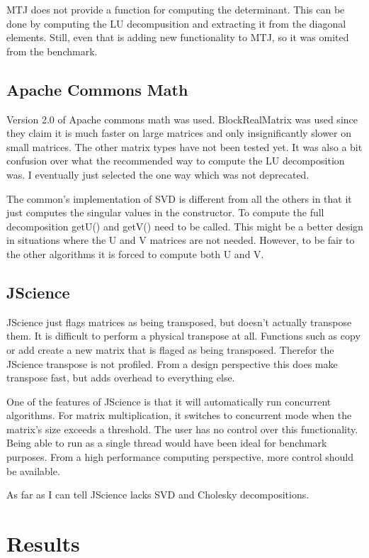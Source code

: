 \documentclass[12pt]{article}%
\begin{document}
MTJ does not provide a function for computing the determinant.  This can be done by computing the LU decompusition and extracting it from the diagonal elements.  Still, even that is adding new functionality to MTJ, so it was omited from the benchmark.

\subsection{Apache Commons Math}

Version 2.0 of Apache commons math was used.  BlockRealMatrix was used since they claim it is much faster on large matrices and only insignificantly slower on small matrices.  The other matrix types have not been tested yet.  It was also a bit confusion over what the recommended way to compute the LU decomposition was.  I eventually just selected the one way which was not deprecated.

The common's implementation of SVD is different from all the others in that it just computes the singular values in the constructor.  To compute the full decomposition getU() and getV() need to be called.  This might be a better design in situations where the U and V matrices are not needed.  However, to be fair to the other algorithms it is forced to compute both U and V.

\subsection{JScience}

JScience just flags matrices as being transposed, but doesn't actually transpose them.  It is difficult to perform a physical transpose at all.  Functions such as copy or add create a new matrix that is flaged as being transposed.  Therefor the JScience transpose is not profiled.  From a design perspective this does make transpose fast, but adds overhead to everything else.

One of the features of JScience is that it will automatically run concurrent algorithms.  For matrix multiplication, it switches to concurrent mode when the matrix's size exceeds a threshold.   The user has no control over this functionality.  Being able to run as a single thread would have been ideal for benchmark purposes.  From a high performance computing perspective, more control should be available.

As far as I can tell JScience lacks SVD and Cholesky decompositions.

\section{Results}
\end{document}
